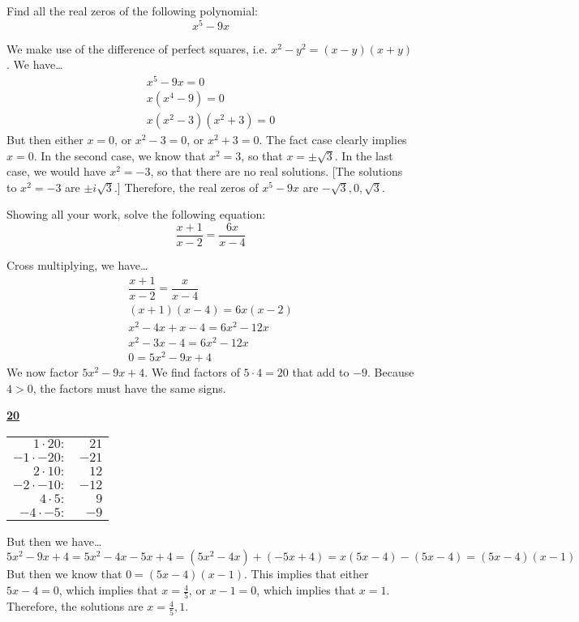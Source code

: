 \documentclass[11pt,letterpaper]{article}
\begin{document}
\newpage



 Find all the real zeros of the following polynomial:
	\[
	x^5 - 9x
	\] \pspace

\sol We make use of the difference of perfect squares, i.e. $x^2 - y^2= (x - y)(x + y)$. We have\dots
	\[
	\begin{gathered}
	x^5 - 9x= 0 \\
	x (x^4 - 9)= 0 \\
	x(x^2 - 3)(x^2 + 3)= 0
	\end{gathered}
	\]
But then either $x= 0$, or $x^2 - 3= 0$, or $x^2 + 3= 0$. The fact case clearly implies $x= 0$. In the second case, we know that $x^2= 3$, so that $x= \pm \sqrt{3}$. In the last case, we would have $x^2= -3$, so that there are no real solutions. [The solutions to $x^2= -3$ are $\pm i \sqrt{3}$.] Therefore, the real zeros of $x^5 - 9x$ are $-\sqrt{3}, 0, \sqrt{3}$. 



\newpage



 Showing all your work, solve the following equation:
	\[
	\dfrac{x + 1}{x - 2}= \dfrac{6x}{x - 4}
	\] \pspace

\sol Cross multiplying, we have\dots
	\[
	\begin{gathered}
	\dfrac{x + 1}{x - 2}= \dfrac{x}{x - 4} \\
	(x + 1)(x - 4)= 6x(x - 2) \\
	x^2 - 4x + x - 4= 6x^2 - 12x \\
	x^2 - 3x - 4= 6x^2 - 12x \\
	0= 5x^2 - 9x + 4
	\end{gathered}
	\]
We now factor $5x^2 - 9x + 4$. We find factors of $5 \cdot 4= 20$ that add to $-9$. Because $4 > 0$, the factors must have the same signs. 
	\begin{table}[!ht]
	\centering
	\underline{\bfseries 20} \pvspace{0.2cm}
	\begin{tabular}{rr} 
	$1 \cdot 20 \colon$ & $21$ \\
	$-1 \cdot -20 \colon$ & $-21$ \\
	$2 \cdot 10 \colon$ & $12$ \\
	$-2 \cdot -10 \colon$ & $-12$ \\
	$4 \cdot 5 \colon$ & $9$ \\ \hline
	\multicolumn{1}{|r}{$-4 \cdot -5 \colon$} & \multicolumn{1}{r|}{$-9$} \\ \hline
	\end{tabular}
	\end{table}
But then we have\dots
	\[
	5x^2 - 9x + 4= 5x^2 - 4x - 5x + 4= (5x^2 - 4x) + (-5x + 4)= x(5x - 4) - (5x - 4)= (5x - 4)(x - 1)
	\]
But then we know that $0= (5x - 4)(x - 1)$. This implies that either $5x - 4= 0$, which implies that $x= \frac{4}{5}$, or $x - 1= 0$, which implies that $x= 1$. Therefore, the solutions are $x= \frac{4}{5}, 1$. 
\end{document}
